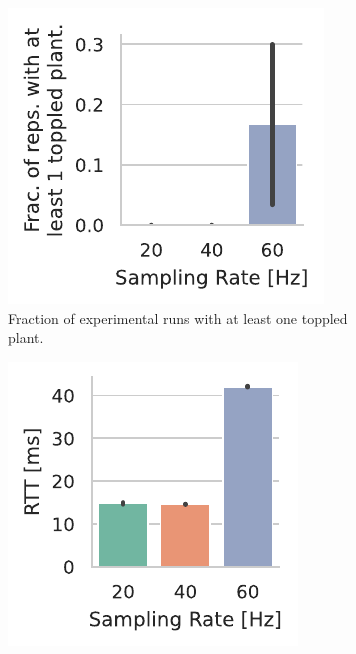\begin{figure}[t]
    \centering
    \begin{subfigure}[t]{.45\textwidth}
        \centering
        \includegraphics[width=\textwidth]{publications/2022CLEAVE/plots/fixed_video_topple_frac}
        \caption{Fraction of experimental runs with at least one toppled plant.}%
    \end{subfigure}%
    \hfill%
    \begin{subfigure}[t]{.45\textwidth}
        \centering
        \includegraphics[width=\textwidth]{publications/2022CLEAVE/plots/fixed_video_rtt}

\end{subfigure}
\end{figure}
